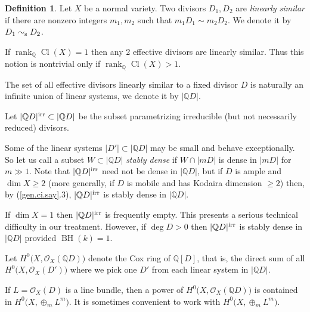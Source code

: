 \documentclass{amsart}
\theoremstyle{definition}
\newtheorem{defn}[thm]{Definition}
\theoremstyle{remark}
\renewcommand{\o}[0]{{\mathcal O}}
\newcommand{\q}[0]{{\mathbb Q}}
\newcommand{\qrank}[0]{\operatorname{rank}_{\q}}
\newcommand{\cl}[0]{\operatorname{Cl}}
\newcommand{\BH}[0]{\operatorname{BH}}
\newcommand{\sims}[0]{\sim_{\rm s}}
\begin{document}
 
\begin{defn}\label{QD.defn} 
Let $X$ be a normal variety.
Two divisors $D_1, D_2$ are {\it linearly similar} 
if there are nonzero integers $m_1, m_2$ such that $m_1D_1\sim m_2 D_2$. 
We denote it by  $D_1\sims D_2$.

If $\qrank\cl(X)=1$ then any 2 effective divisors are linearly similar.
Thus this notion is nontrivial only if $\qrank\cl(X)>1$.

 The set of all effective divisors linearly similar to a  fixed divisor $D$ is naturally an
infinite union of linear systems, we denote it by $|\q D|$. 
 



Let $|\q D|^{\rm irr}\subset |\q D|$  be the  subset parametrizing irreducible (but not necessarily reduced) divisors. 

Some of the linear systems   $|D'|\subset |\q D|$ may be small and behave exceptionally. So let us call a subset $W\subset |\q D|$ {\it stably dense} if
$W\cap |mD|$ is dense in $|mD|$ for $m\gg 1$. 
Note that $|\q D|^{\rm irr}$ need not be dense in $ |\q D|$, but 
 if  $D$ is ample and $\dim X\geq 2$ (more generally, if $D$ is mobile and has Kodaira dimension $\geq 2$) then, by (\ref{gen.ci.say}.3),   $|\q D|^{\rm irr}$
is stably dense in   $ |\q D|$.  

If $\dim X=1$ then $|\q D|^{\rm irr}$ is frequently empty. 
This presents a serious technical difficulty in our treatment.
However, if $\deg D>0$
then $|\q D|^{\rm irr}$ is stably dense in $ |\q D|$
provided   $\BH(k)=1$.








Let $H^0\bigl (X, \o_X(\q D)\bigr)$ denote the  Cox ring of $\q [D]$, that is, the direct sum  of all
$H^0\bigl (X, \o_X(D')\bigr)$ where  we pick one $D'$ from each linear system in 
$|\q D|$. 

If $L=\o_X(D)$ is a line bundle, then  a power of $H^0\bigl (X, \o_X(\q D)\bigr)$
is contained in $H^0\bigl (X, \oplus_mL^m\bigr)$. It is sometimes  convenient 
 to  work with $H^0\bigl (X, \oplus_mL^m\bigr)$.

\end{defn}
\end{document}
